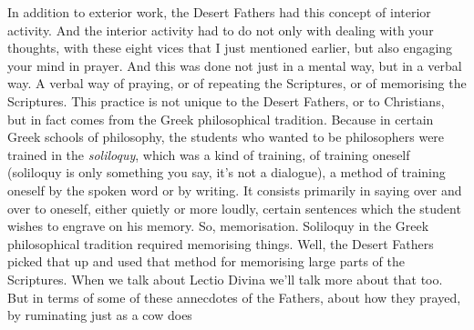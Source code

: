 In addition to exterior work, the Desert Fathers had this concept of interior activity. And the interior activity had to do not only with dealing with your thoughts, with these eight vices that I just mentioned earlier, but also engaging your mind in prayer. And this was done not just in a mental way, but in a verbal way. A verbal way of praying, or of repeating the Scriptures, or of memorising the Scriptures. This practice is not unique to the Desert Fathers, or to Christians, but in fact comes from the Greek philosophical tradition. Because in certain Greek schools of philosophy, the students who wanted to be philosophers were trained in the \emph{soliloquy}, which was a kind of training, of training oneself (soliloquy is only something you say, it's not a dialogue), a method of training oneself by the spoken word or by writing. It consists primarily in saying over and over to oneself, either quietly or more loudly, certain sentences which the student wishes to engrave on his memory. So, memorisation. Soliloquy in the Greek philosophical tradition required memorising things. Well, the Desert Fathers picked that up and used that method for memorising large parts of the Scriptures. When we talk about Lectio Divina we'll talk more about that too. But in terms of some of these annecdotes of the Fathers, about how they prayed, by ruminating just as a cow does












